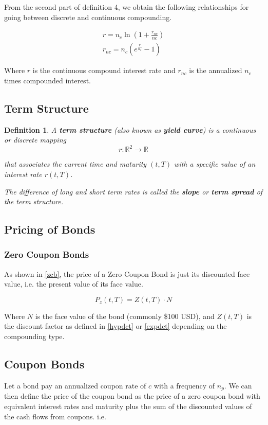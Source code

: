 \documentclass[10pt,letterpaper]{article}
\newtheorem{definition}{Definition}
\begin{document}
From the second part of definition 4, we obtain the following relationships for going between discrete and continuous compounding.

\begin{eqnarray}
r = n_c \ln\left( 1 + \frac{r_{nc}}{nc}\right) \\
r_{nc} = n_c\left(e^{\frac{r}{n_c}} - 1\right)
\end{eqnarray}

Where $r$ is the continuous compound interest rate and $r_{nc}$ is the annualized $n_c$ times compounded interest.

\subsection{Term Structure}
\begin{definition}
A \emph{\textbf{term structure}} (also known as \emph{\textbf{yield curve}}) is a continuous or discrete mapping
$$r: \mathbb{R}^2 \to \mathbb{R}$$

that associates the current time and maturity $(t, T)$ with a specific value of an interest rate $r(t, T)$.

The difference of long and short term rates is called the \emph{\textbf{slope}} or \emph{\textbf{term spread}} of the term structure.
\end{definition}

\subsection{Pricing of Bonds}
\subsubsection{Zero Coupon Bonds}
As shown in \eqref{zcb}, the price of a Zero Coupon Bond is just its discounted face value, i.e. the present value of its face value.

\begin{equation}\label{zcb}
P_z(t, T) = Z(t, T) \cdot N
\end{equation}

Where $N$ is the face value of the bond (commonly \$100 USD), and $Z(t, T)$ is the discount factor as defined in \eqref{hypdct} or \eqref{expdct} depending on the compounding type.

\subsection{Coupon Bonds}
Let a bond pay an annualized coupon rate of $c$ with a frequency of $n_p$. We can then define the price of the coupon bond as the price of a zero coupon bond with equivalent interest rates and maturity plus the sum of the discounted values of the cash flows from coupons. i.e.
\end{document}
